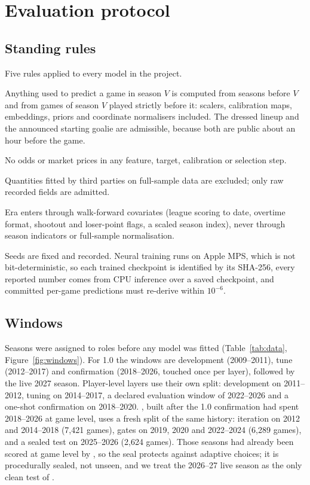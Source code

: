 \section{Evaluation protocol}
\label{sec:protocol}

\subsection{Standing rules}

Five rules applied to every model in the project.
\begin{description}[leftmargin=1.2em,style=nextline]
  \item[Vantage.] Anything used to predict a game in season $V$ is computed
  from seasons before $V$ and from games of season $V$ played strictly before
  it: scalers, calibration maps, embeddings, priors and coordinate
  normalisers included. The dressed lineup and the announced starting goalie
  are admissible, because both are public about an hour before the game.
  \item[Market firewall.] No odds or market prices in any feature, target,
  calibration or selection step.
  \item[External models.] Quantities fitted by third parties on full-sample
  data are excluded; only raw recorded fields are admitted.
  \item[Era conditioning.] Era enters through walk-forward covariates (league
  scoring to date, overtime format, shootout and loser-point flags, a scaled
  season index), never through season indicators or full-sample
  normalisation.
  \item[Determinism.] Seeds are fixed and recorded. Neural training runs on
  Apple MPS, which is not bit-deterministic, so each trained checkpoint is
  identified by its SHA-256, every reported number comes from CPU inference
  over a saved checkpoint, and committed per-game predictions must re-derive
  within $10^{-6}$.
\end{description}

\subsection{Windows}

Seasons were assigned to roles before any model was fitted (Table~\ref{tab:data},
Figure~\ref{fig:windows}). For \neurhl{} 1.0 the windows are development
(2009--2011), tune (2012--2017) and confirmation (2018--2026, touched once per
layer), followed by the live 2027 season. Player-level layers use their own
split: development on 2011--2012, tuning on 2014--2017, a declared evaluation
window of 2022--2026 and a one-shot confirmation on 2018--2020. \neurhlG{}, built
after the 1.0 confirmation had spent 2018--2026 at game level, uses a fresh
split of the same history: iteration on 2012 and 2014--2018 (7,421 games),
gates on 2019, 2020 and 2022--2024 (6,289 games), and a sealed test on
2025--2026 (2,624 games). Those seasons had already been scored at game level
by \neurhlH{}, so the \neurhlG{} seal protects against adaptive \neurhlG{} choices; it is
procedurally sealed, not unseen, and we treat the 2026--27 live season as the
only clean test of \neurhlG{}.

